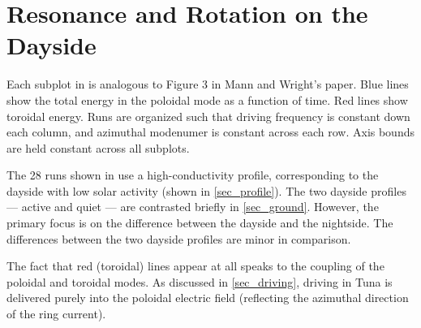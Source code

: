 


\section{Resonance and Rotation on the Dayside}
  \label{sec_day}

Each subplot in \todo{$\cdots$} is analogous to Figure 3 in Mann and Wright's paper\cite{mann_1995}. Blue lines show the total energy in the poloidal mode as a function of time. Red lines show toroidal energy. Runs are organized such that driving frequency is constant down each column, and azimuthal modenumer is constant across each row. Axis bounds are held constant across all subplots. 

The 28 runs shown in \todo{$\cdots$} use a high-conductivity profile, corresponding to the dayside with low solar activity (shown in \cref{sec_profile}). The two dayside profiles --- active and quiet --- are contrasted briefly in \cref{sec_ground}. However, the primary focus is on the difference between the dayside and the nightside. The differences between the two dayside profiles are minor in comparison. 

The fact that red (toroidal) lines appear at all speaks to the coupling of the poloidal and toroidal modes. As discussed in \cref{sec_driving}, driving in Tuna is delivered purely into the poloidal electric field (reflecting the azimuthal direction of the ring current). 

